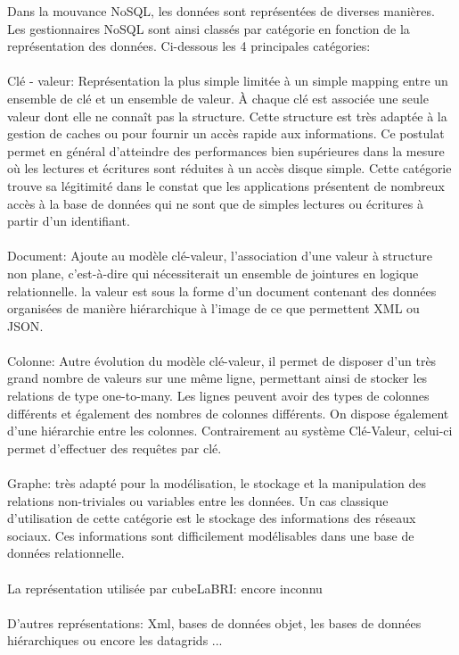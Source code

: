 Dans la mouvance \textsf{NoSQL}, les données sont représentées de
diverses manières. Les gestionnaires \textsf{NoSQL} sont ainsi classés par catégorie en fonction de la représentation des données. Ci-dessous les 4 principales catégories: 
\\\\ \textsf{Clé - valeur}: Représentation la plus simple limitée à un simple mapping entre un ensemble de clé et un ensemble de valeur. À chaque clé est associée une seule valeur dont elle ne connaît pas la structure. Cette structure est très adaptée à la
gestion de caches ou pour fournir un accès rapide aux
informations. Ce postulat
permet en général d’atteindre des performances bien supérieures dans
la mesure où les lectures et écritures sont réduites à un accès disque
simple. Cette catégorie trouve sa légitimité dans le constat que les
applications présentent de nombreux accès à la base de données qui ne
sont que de simples lectures ou écritures à partir d’un
identifiant\cite{cleValeur}.  \\\\ {\sf Document}:
Ajoute au modèle clé-valeur,
l’association d’une valeur à structure non plane, c’est-à-dire qui
nécessiterait un ensemble de jointures en logique relationnelle.  la
valeur est sous la forme d'un document contenant des données
organisées de manière hiérarchique à l’image de ce que permettent
\textsf{XML} ou \textsf{JSON}.  \\\\ {\sf Colonne}: Autre évolution du modèle clé-valeur, il permet de
disposer d'un très grand nombre de valeurs sur une même ligne,
permettant ainsi de stocker les relations de type one-to-many. Les
lignes peuvent avoir des types de colonnes différents et également des
nombres de colonnes différents. On dispose également d'une hiérarchie
entre les colonnes. Contrairement au système Clé-Valeur, celui-ci
permet d’effectuer des requêtes par clé.  \\\\ {\sf
  Graphe}: très adapté pour la modélisation, le
stockage et la manipulation des relations non-triviales ou variables
entre les données. Un cas classique d'utilisation de cette catégorie
est le stockage des informations des réseaux sociaux. Ces informations
sont difficilement modélisables dans une base de données
relationnelle.  \\ \\ {\color{red} {\sf La représentation utilisée par
    cubeLaBRI}: encore inconnu} \\ \\ \textsf{D'autres
  représentations}: \textsf{Xml}, \textsf{bases de données objet},
\textsf{les bases de données hiérarchiques ou encore les datagrids}
...

